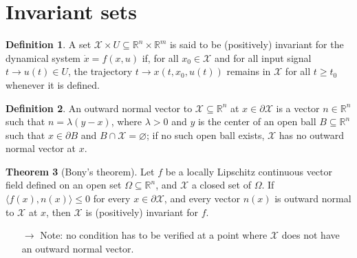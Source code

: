\documentclass[12pt, openany]{report}
\theoremstyle{definition}
\newtheorem{thm}{Theorem}[chapter]
\newtheorem{definition}[thm]{Definition}
\newcommand{\R}{\mathbb{R}}
\let\emptyset\varnothing
\begin{document}
\section{Invariant sets}
\begin{definition}
    A set \(\mathcal{X} \times U\subseteq \R^n\times \R^m\) is said to be (positively) invariant for the dynamical system \(\dot x=f(x,u)\) if, for all \(x_0\in \mathcal{X}\) and for all input signal \(t\rightarrow u(t)\in U\), the trajectory \(t\rightarrow x(t,x_0,u(t))\) remains in \(\mathcal{X}\) for all \(t\ge t_0\) whenever it is defined.
\end{definition}
\begin{definition}
    An outward normal vector to \(\mathcal{X}\subseteq \R^n\) at \(x\in \partial \mathcal{X}\) is a vector \(n\in \R^n\) such that \(n=\lambda(y-x)\), where \(\lambda >0\) and \(y\) is the center of an open ball \(B\subseteq \R^n\) such that \(x\in \partial B\) and \(B\cap \mathcal{X}=\emptyset\); if no such open ball exists, \(\mathcal{X}\) has no outward normal vector at \(x\). 
\end{definition}
\begin{thm}[Bony's theorem]
    Let \(f\) be a locally Lipschitz continuous vector field defined on an open set \(\Omega \subseteq \R^n\), and \(\mathcal{X}\) a closed set of \(\Omega\). If \(\langle f(x),n(x)\rangle \le 0\) for every \(x\in \partial \mathcal{X}\), and every vector \(n(x)\) is outward normal to \(\mathcal{X}\) at \(x\), then \(\mathcal{X}\) is (positively) invariant for \(f\).
\end{thm}
\begin{itemize}
    \item [\(\rightarrow\)] Note: no condition has to be verified at a point where \(\mathcal{X}\) does not have an outward normal vector.
\end{itemize}
\end{document}
